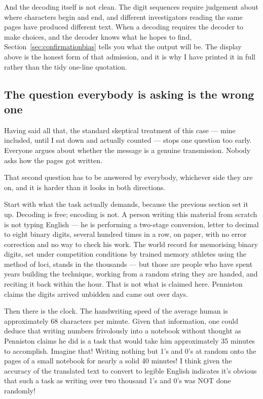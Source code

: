 And the decoding itself is not clean. The digit sequences require judgement about where
characters begin and end, and different investigators reading the same pages have produced
different text. When a decoding requires the decoder to make choices, and the decoder knows
what he hopes to find, Section~\ref{sec:confirmationbias} tells you what the output will be.
The display above is the honest form of that admission, and it is why I have printed it in
full rather than the tidy one-line quotation.

\subsection*{The question everybody is asking is the wrong one}

Having said all that, the standard skeptical treatment of this case --- mine included, until I
sat down and actually counted --- stops one question too early. Everyone argues about whether
the message is a genuine transmission. Nobody asks how the pages got written.


That second question has to be answered by everybody, whichever side they are on, and it is
harder than it looks in both directions.

Start with what the task actually demands, because the previous section set it up. Decoding is
free; encoding is not. A person writing this material from scratch is not typing English --- he
is performing a two-stage conversion, letter to decimal to eight binary digits, several hundred
times in a row, on paper, with no error correction and no way to check his work. 
The world record for memorising binary digits, set under competition conditions by trained
memory athletes using the method of loci, stands in the thousands --- but those are people who
have spent years building the technique, working from a random string they are handed, and
reciting it back within the hour. That is not what is claimed here. Penniston claims the digits
arrived unbidden and came out over days.

Then there is the clock. The handwriting speed of the average human is approximately 68
characters per minute. Given that information, one could deduce that writing numbers
frivolously into a notebook without thought as Penniston claims he did is a task that would
take him approximately 35 minutes to accomplish. Imagine that! Writing nothing but 1's and
0's at random onto the pages of a small notebook for nearly a solid 40 minutes! I think given
the accuracy of the translated text to convert to legible English indicates it's obvious that
such a task as writing over two thousand 1's and 0's was NOT done randomly!

